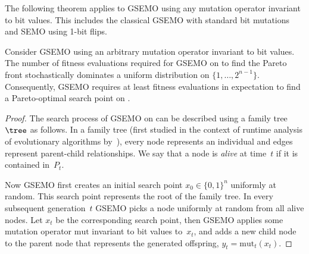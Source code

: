     The following theorem applies to GSEMO using any mutation operator invariant to bit values. This includes the classical GSEMO with standard bit mutations and SEMO using 1-bit flips. 
\begin{theorem}
\label{thm:GSEMO-inef-Binval}
   Consider GSEMO using an arbitrary mutation operator invariant to bit values.
   The number of 
   fitness evaluations 
   required for GSEMO on \OZBinval to find the Pareto front 
   stochastically dominates
   a uniform distribution on $\{1, \dots, 2^{n-1}\}$. Consequently, GSEMO requires at least 
   fitness evaluations in expectation to find a Pareto-optimal search point on \OZBinval.
\end{theorem}
\begin{proof}
    The search process of GSEMO on \BV can be described using a family tree $\tree$ as follows. In a family tree (first studied in the context of runtime analysis of evolutionary algorithms by~\citet{Witt2006}), every node represents an individual and edges represent parent-child relationships.
    We say that a node is \textit{alive} at time~$t$ if it is contained in~$P_t$.
    
    Now GSEMO first creates an initial search point $x_0 \in \{0, 1\}^n$ uniformly at random. 
    This search point represents the root of the family tree. In every subsequent generation~$t$ GSEMO picks a node uniformly at random from all alive nodes. Let $x_t$ be the corresponding search point, then GSEMO applies some mutation operator $\mathrm{mut}$ invariant to bit values to~$x_t$, and adds a new child node to the parent node that represents the generated offspring, $y_t = \mathrm{mut}_t(x_t)$.


\end{proof}
